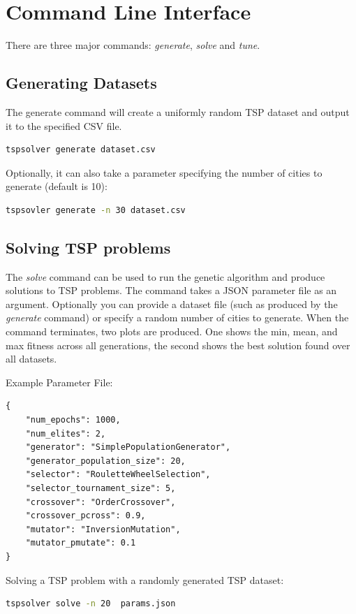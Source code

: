 \documentclass[journal]{IEEEtran}
\begin{document}
\section{Command Line Interface}
\label{appendix:cli}
There are three major commands: \textit{generate}, \textit{solve} and \textit{tune}. 

\subsection{Generating Datasets}
The generate command will create a uniformly random TSP dataset and output it to the specified CSV file.

\begin{lstlisting}[language=Bash]
tspsolver generate dataset.csv	
\end{lstlisting}

Optionally, it can also take a parameter specifying the number of cities to generate (default is 10):

\begin{lstlisting}[language=Bash]
tspsovler generate -n 30 dataset.csv	
\end{lstlisting}


\subsection{Solving TSP problems}
The \textit{solve} command can be used to run the genetic algorithm and produce solutions to TSP problems. The command takes a JSON parameter file as an argument. Optionally you can provide a dataset file (such as produced by the \textit{generate} command) or specify a random number of cities to generate. When the command terminates, two plots are produced. One shows the min, mean, and max fitness across all generations, the second shows the best solution found over all datasets.

Example Parameter File:
\begin{lstlisting}
{
    "num_epochs": 1000,
    "num_elites": 2,
    "generator": "SimplePopulationGenerator",
    "generator_population_size": 20,
    "selector": "RouletteWheelSelection",
    "selector_tournament_size": 5,
    "crossover": "OrderCrossover",
    "crossover_pcross": 0.9,
    "mutator": "InversionMutation",
    "mutator_pmutate": 0.1
}
\end{lstlisting}

Solving a TSP problem with a randomly generated TSP dataset:

\begin{lstlisting}[language=Bash]
tspsolver solve -n 20  params.json
\end{lstlisting}
\end{document}
